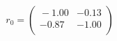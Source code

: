\documentclass[10pt,a4paper]{article}
\begin{document}
 \begin{equation*} r_0  =  %
\begin{pmatrix}{}
  -1.00 & -0.13 \\ 
  -0.87 & -1.00 \\ 
  \end{pmatrix}
 \end{equation*} 
\end{document}
